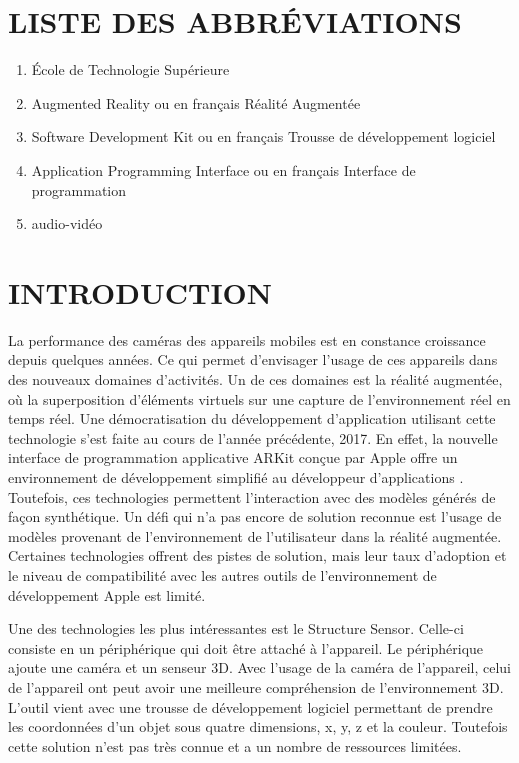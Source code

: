 \documentclass[letterpaper,twoside,12pt,french]{report}
\newcommand{\abbrItem}[2]{\item[\uppercase{\textbf{#1}} -] #2}
\begin{document}
\chapter*{\uppercase{Liste des abbréviations}}
\begin{enumerate}
        \abbrItem{ÉTS}{École de Technologie Supérieure}
        \abbrItem{AR}{Augmented Reality ou en français Réalité Augmentée}
        \abbrItem{SDK}{Software Development Kit ou en français Trousse de développement logiciel}
        \abbrItem{API}{Application Programming Interface ou en français Interface de programmation}
        \abbrItem{AV}{audio-vidéo}
\end{enumerate}
\cleardoublepage
{}
\chapter*{\uppercase{Introduction}}
La performance des caméras des appareils mobiles est en constance croissance depuis quelques
années. Ce qui permet d'envisager l'usage de ces appareils dans des nouveaux domaines d'activités.
Un de ces domaines est la réalité augmentée, où la superposition d'éléments virtuels sur une
capture de l'environnement réel en temps réel. Une démocratisation du développement d'application
utilisant cette technologie s'est faite au cours de l'année précédente, 2017. En effet, la nouvelle
interface de programmation applicative ARKit conçue par Apple offre un environnement de
développement simplifié au développeur d'applications \citep*{StattN2017}. Toutefois, ces technologies
permettent l'interaction avec des modèles générés de façon synthétique. Un défi qui n'a pas encore
de solution reconnue est l'usage de modèles provenant de l'environnement de l'utilisateur dans la
réalité augmentée. Certaines technologies offrent des pistes de solution, mais leur taux d'adoption
et le niveau de compatibilité avec les autres outils de l'environnement de développement Apple est
limité.
\par
Une des technologies les plus intéressantes est le Structure Sensor\citep*{molitchHou01}. Celle-ci
consiste en un périphérique qui doit être attaché à l'appareil. Le périphérique ajoute une caméra
et un senseur 3D. Avec l'usage de la caméra de l'appareil, celui de l'appareil ont peut avoir une
meilleure compréhension de l'environnement 3D. L'outil vient avec une trousse de développement
logiciel permettant de prendre les coordonnées d'un objet sous quatre dimensions, x, y, z et la
couleur. Toutefois cette solution n'est pas très connue et a un nombre de ressources limitées.
\end{document}
